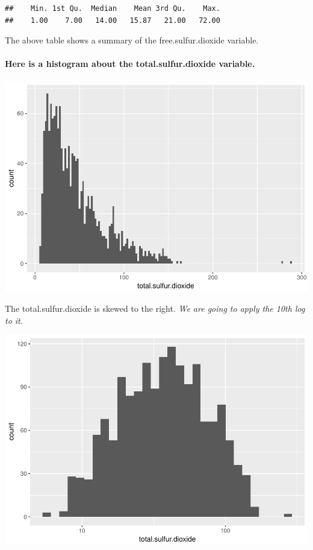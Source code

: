 \documentclass[]{article}
\let\oldparagraph\paragraph
\renewcommand{\paragraph}[1]{\oldparagraph{#1}\mbox{}}
\begin{document}
\begin{verbatim}
##    Min. 1st Qu.  Median    Mean 3rd Qu.    Max. 
##    1.00    7.00   14.00   15.87   21.00   72.00
\end{verbatim}

The above table shows a summary of the free.sulfur.dioxide variable.

\paragraph{Here is a histogram about the total.sulfur.dioxide
variable.}\label{here-is-a-histogram-about-the-total.sulfur.dioxide-variable.}

\includegraphics{RedWine_files/figure-latex/Make_Plot_Function_For_total.sulfur.dioxide-1.pdf}

The total.sulfur.dioxide is skewed to the right. \emph{We are going to
apply the 10th log to it.}

\includegraphics{RedWine_files/figure-latex/Make_Plot_Function_For_total.sulfur.dioxide_log10-1.pdf}
\end{document}
